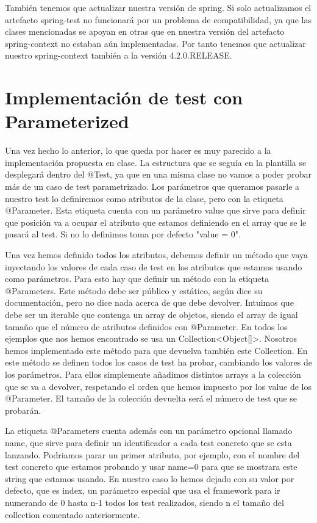 \documentclass[a4paper]{article}
\begin{document}
También tenemos que actualizar nuestra versión de spring. Si solo actualizamos el artefacto spring-test no funcionará por un problema de compatibilidad, ya que las clases mencionadas se apoyan en otras que en nuestra versión del artefacto spring-context no estaban aún implementadas. Por tanto tenemos que actualizar nuestro spring-context también a la versión 4.2.0.RELEASE.

\section{Implementación de test con Parameterized}

Una vez hecho lo anterior, lo que queda por hacer es muy parecido a la implementación propuesta en clase. La estructura que se seguía en la plantilla se desplegará dentro del @Test, ya que en una misma clase no vamos a poder probar más de un caso de test parametrizado. Los parámetros que queramos pasarle a nuestro test lo definiremos como atributos de la clase, pero con la etiqueta @Parameter. Esta etiqueta cuenta con un parámetro value que sirve para definir que posición va a ocupar el atributo que estamos definiendo en el array que se le pasará al test. Si no lo definimos toma por defecto "value = 0".

Una vez hemos definido todos los atributos, debemos definir un método que vaya inyectando los valores de cada caso de test en los atributos que estamos usando como parámetros. Para esto hay que definir un método con la etiqueta @Parameters. Este método debe ser público y estático, según dice su documentación, pero no dice nada acerca de que debe devolver. Intuimos que debe ser un iterable que contenga un array de objetos, siendo el array de igual tamaño que el número de atributos definidos con @Parameter. En todos los ejemplos que nos hemos encontrado se usa un Collection<Object[]>. Nosotros hemos implementado este método para que devuelva también este Collection. En este método se definen todos los casos de test ha probar, cambiando los valores de los parámetros. Para ellos simplemente añadimos distintos arrays a la colección que se va a devolver, respetando el orden que hemos impuesto por los value de los @Parameter. El tamaño de la colección devuelta será el número de test que se probarán.

La etiqueta @Parameters cuenta además con un parámetro opcional llamado name, que sirve para definir un identificador a cada test concreto que se esta lanzando. Podriamos parar un primer atributo, por ejemplo, con el nombre del test concreto que estamos probando y usar name={0} para que se mostrara este string que estamos usando. En nuestro caso lo hemos dejado con su valor por defecto, que es {index}, un parámetro especial que usa el framework para ir numerando de 0 hasta n-1 todos los test realizados, siendo n el tamaño del collection comentado anteriormente. 
\end{document}
